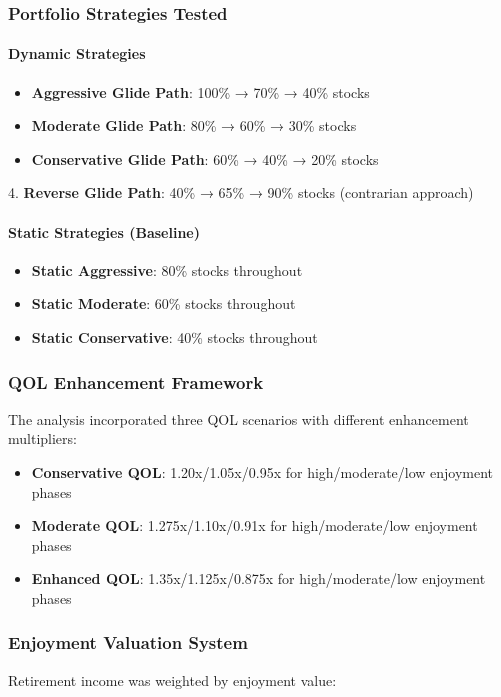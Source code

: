 \documentclass[11pt,letterpaper]{article}
\begin{document}
\subsubsection{Portfolio Strategies Tested}

\paragraph{Dynamic Strategies}
\begin{itemize}
\item \textbf{Aggressive Glide Path}: 100\% → 70\% → 40\% stocks
\item \textbf{Moderate Glide Path}: 80\% → 60\% → 30\% stocks
\item \textbf{Conservative Glide Path}: 60\% → 40\% → 20\% stocks
\end{itemize}
4. \textbf{Reverse Glide Path}: 40\% → 65\% → 90\% stocks (contrarian approach)


\paragraph{Static Strategies (Baseline)}
\begin{itemize}
\item \textbf{Static Aggressive}: 80\% stocks throughout
\item \textbf{Static Moderate}: 60\% stocks throughout
\item \textbf{Static Conservative}: 40\% stocks throughout
\end{itemize}

\subsubsection{QOL Enhancement Framework}
The analysis incorporated three QOL scenarios with different enhancement multipliers:

\begin{itemize}
\item \textbf{Conservative QOL}: 1.20x/1.05x/0.95x for high/moderate/low enjoyment phases
\item \textbf{Moderate QOL}: 1.275x/1.10x/0.91x for high/moderate/low enjoyment phases
\item \textbf{Enhanced QOL}: 1.35x/1.125x/0.875x for high/moderate/low enjoyment phases
\end{itemize}

\subsubsection{Enjoyment Valuation System}
Retirement income was weighted by enjoyment value:
\end{document}
